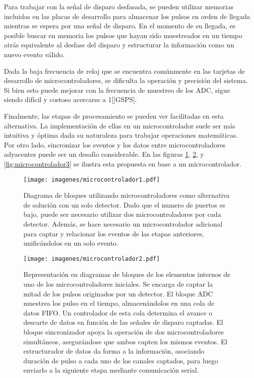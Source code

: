 \par Para trabajar con la señal de disparo desfasada, se pueden utilizar memorias incluidas en las placas de desarrollo para almacenar los pulsos en orden de llegada mientras se espera por una señal de disparo. En el momento de su llegada, es posible buscar en memoria los pulsos que hayan sido muestreados en un tiempo atrás equivalente al desfase del disparo y estructurar la información como un nuevo evento válido.

\par Dada la baja frecuencia de reloj que se encuentra comúnmente en las tarjetas de desarrollo de microcontroladores, se dificulta la operación y precisión del sistema. Si bien esto puede mejorar con la frecuencia de muestreo de los ADC, sigue siendo difícil y costoso acercarse a 1[]GSPS].

\par Finalmente, las etapas de procesamiento se pueden ver facilitadas en esta alternativa. La implementación de ellas en un microcontrolador suele ser más intuitiva y óptima dada su naturaleza para trabajar operaciones matemáticas. Por otro lado, sincronizar los eventos y los datos entre microcontroladores adyacentes puede ser un desafío considerable. En las figuras \ref{fig:microcontrolador1}, \ref{fig:microcontrolador2}, y \ref{fig:microcontrolador3} se ilustra esta propuesta en base a un microcontrolador.

\begin{figure}[H]
    \centering
    \texttt{[image: imagenes/microcontrolador1.pdf]}
    \caption{Diagrama de bloques utilizando microcontroladores como alternativa de solución con un solo detector. Dado que el numero de puertos es bajo, puede ser necesario utilizar dos microcontroladores por cada detector. Además, se hace necesario un microcontrolador adicional para captar y relacionar los eventos de las etapas anteriores, unificándolos en un solo evento.}
    \label{fig:microcontrolador1}
\end{figure}

\begin{figure}[H]
    \centering
    \texttt{[image: imagenes/microcontrolador2.pdf]}
    \caption{Representación en diagramas de bloques de los elementos internos de uno de los microcontroladores iniciales. Se encarga de captar la mitad de los pulsos originados por un detector. El bloque ADC muestrea los pulso en el tiempo, almacenándolos en una cola de datos FIFO. Un controlador de esta cola determina el avance o descarte de datos en función de las señales de disparo captadas. El bloque sincronizador apoya la operación de dos microcontroladores simultáneos, asegurándose que ambos capten los mismos eventos. El estructurador de datos da forma a la información, asociando duración de pulso a cada uno de los canales captados, para luego enviarlo a la siguiente etapa mediante comunicación serial.}
    \label{fig:microcontrolador2}
\end{figure}

